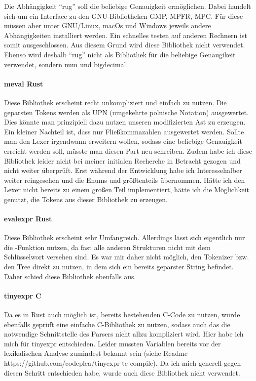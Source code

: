 \documentclass[11pt,a4paper, ngerman]{article}
\begin{document}
Die Abhängigkeit ``rug'' soll die beliebige Genauigkeit ermöglichen. Dabei handelt sich um ein Interface zu den GNU-Bibliotheken GMP, MPFR, MPC. Für diese müssen aber unter GNU/Linux, macOs und Windows jeweils andere Abhängigkeiten installiert werden. Ein schnelles testen auf anderen Rechnern ist somit ausgeschlossen. Aus diesem Grund wird diese Bibliothek nicht verwendet. Ebenso wird deshalb ``rug'' nicht als Bibliothek für die beliebige Genaugikeit verwendet, sondern num und bigdecimal.

\paragraph{meval Rust} Diese Bibliothek erscheint recht unkompliziert und einfach zu nutzen. Die geparsten Tokens werden als UPN (umgekehrte polnische Notation) ausgewertet. Dies könnte man prinzipiell dazu nutzen unseren modifizierten Ast zu erzeugen. Ein kleiner Nachteil ist, dass nur Fließkommazahlen ausgewertet werden. Sollte man den Lexer irgendwann erweitern wollen, sodass eine beliebige Genauigkeit erreicht werden soll, müsste man diesen Part neu schreiben. Zudem habe ich diese Bibliothek leider nicht bei meiner initialen Recherche in Betracht gezogen und nicht weiter überprüft. Erst während der Entwicklung habe ich Interessehalber weiter reingesehen und die Enums  und  größtenteils übernommen. Hätte ich den Lexer nicht bereits zu einem großen Teil implementiert, hätte ich die Möglichkeit genutzt, die Tokens aus dieser Bibliothek zu erzeugen.

\paragraph{evalexpr Rust} Diese Bibliothek erscheint sehr Umfangreich. Allerdings lässt sich eigentlich nur die -Funktion nutzen, da fast alle anderen Strukturen nicht mit dem Schlüsselwort  versehen sind. Es war mir daher nicht möglich, den Tokenizer bzw. den Tree direkt zu nutzen, in dem sich ein bereits geparster String befindet. Daher schied diese Bibliothek ebenfalls aus.

\paragraph{tinyexpr C} Da es in Rust auch möglich ist, bereits bestehenden C-Code zu nutzen, wurde ebenfalls geprüft eine einfache C-Bibliothek zu nutzen, sodass auch das die notwendige Schnittstelle des Parsers nicht allzu kompliziert wird. Hier habe ich mich für tinyexpr entschieden. Leider mussten Variablen bereits vor der lexikalischen Analyse zumindest bekannt sein (siehe Readme https://github.com/codeplea/tinyexpr te compile). Da ich mich generell gegen diesen Schritt entschieden habe, wurde auch diese Bibliothek nicht verwendet.
\end{document}
